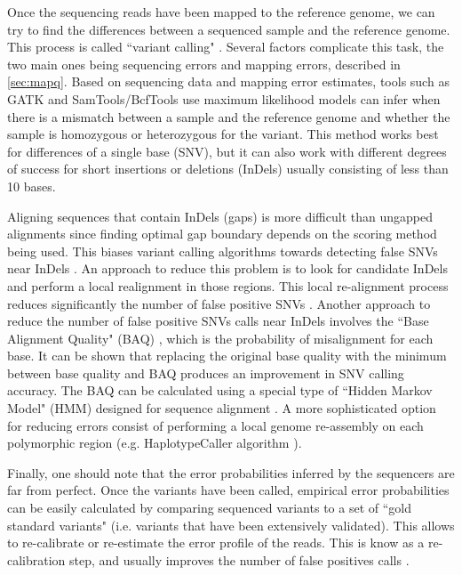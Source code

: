 Once the sequencing reads have been mapped to the reference genome, we can try to find the differences between a sequenced sample and the reference genome. This process is called ``variant calling" \cite{nielsen2011genotype}.  Several factors complicate this task, the two main ones being sequencing errors and mapping errors, described in \ref{sec:mapq}. Based on sequencing data and mapping error estimates, tools such as GATK \cite{mckenna2010genome} and SamTools/BcfTools \cite{li2008mapping} use maximum likelihood models can infer when there is a mismatch between a sample and the reference genome and whether the sample is homozygous or heterozygous for the variant. This method works best for differences of a single base (SNV), but it can also work with different degrees of success for short insertions or deletions (InDels) usually consisting of less than 10 bases. 

Aligning sequences that contain InDels (gaps) is more difficult than ungapped alignments since finding optimal gap boundary depends on the scoring method being used. This biases variant calling algorithms towards detecting false SNVs near InDels \cite{depristo2011framework}.  An approach to reduce this problem is to look for candidate InDels and perform a local realignment in those regions.  This local re-alignment process reduces significantly the number of false positive SNVs \cite{depristo2011framework}. Another approach to reduce the number of false positive SNVs calls near InDels involves the ``Base Alignment Quality" (BAQ) \cite{li2011improving}, which is the probability of misalignment for each base.  It can be shown that replacing the original base quality with the minimum between base quality and BAQ produces an improvement in SNV calling accuracy.  The BAQ can be calculated using a special type of ``Hidden Markov Model" (HMM) designed for sequence alignment \cite{li2011improving, durbin1998biological}. A more sophisticated option for reducing errors consist of performing a local genome re-assembly on each polymorphic region (e.g. HaplotypeCaller algorithm \cite{GATK}).

Finally, one should note that the error probabilities inferred by the sequencers are far from perfect.  Once the variants have been called, empirical error probabilities can be easily calculated \cite{mckenna2010genome} by comparing sequenced variants to a set of ``gold standard variants" (i.e. variants that have been extensively validated).  This allows to re-calibrate or re-estimate the error profile of the reads.  This is know as a re-calibration step, and usually improves the number of false positives calls \cite{depristo2011framework}.

